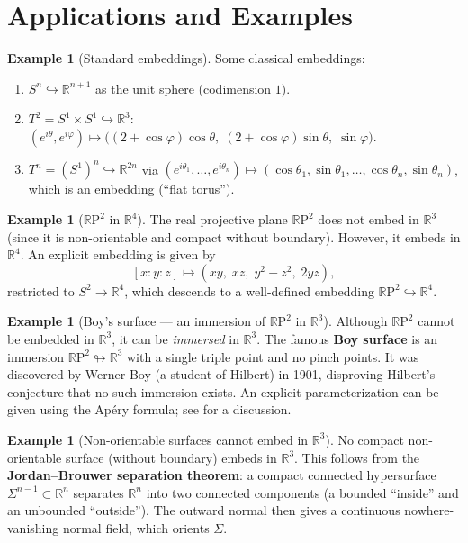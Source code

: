 \documentclass[12pt,a4paper,openany]{book}
\theoremstyle{definition}
\newtheorem{example}[theorem]{Example}
\theoremstyle{remark}
\newcommand{\R}{\mathbb{R}}
\newcommand{\RP}{\mathbb{R}\mathrm{P}}
\begin{document}
\section{Applications and Examples}\label{sec:whitney-applications}

\begin{example}[Standard embeddings]\label{ex:standard-embeddings}
Some classical embeddings:
\begin{enumerate}[label=(\alph*)]
  \item $S^n \hookrightarrow \R^{n+1}$ as the unit sphere (codimension $1$).
  \item $T^2 = S^1 \times S^1 \hookrightarrow \R^3$:
    $(e^{i\theta},e^{i\varphi}) \mapsto
    \bigl((2+\cos\varphi)\cos\theta,\;(2+\cos\varphi)\sin\theta,\;\sin\varphi\bigr)$.
  \item $T^n = (S^1)^n \hookrightarrow \R^{2n}$ via
    $(e^{i\theta_1},\dots,e^{i\theta_n})\mapsto(\cos\theta_1,\sin\theta_1,\dots,\cos\theta_n,\sin\theta_n)$,
    which is an embedding (``flat torus'').
\end{enumerate}
\end{example}

\begin{example}[$\RP^2$ in $\R^4$]\label{ex:rp2-r4}
The real projective plane $\RP^2$ does not embed in $\R^3$
(since it is non-orientable and compact without boundary). However,
it embeds in $\R^4$. An explicit embedding is given by
\[
  [x:y:z] \mapsto (xy,\; xz,\; y^2 - z^2,\; 2yz),
\]
restricted to $S^2 \to \R^4$, which descends to a well-defined
embedding $\RP^2 \hookrightarrow \R^4$.
\end{example}

\begin{example}[Boy's surface --- an immersion of $\RP^2$ in $\R^3$]\label{ex:boy-surface}
Although $\RP^2$ cannot be embedded in $\R^3$, it can be \emph{immersed}
in $\R^3$. The famous \textbf{Boy surface} is an immersion
$\RP^2 \looparrowright \R^3$ with a single triple point and no pinch points.
It was discovered by Werner Boy (a student of Hilbert) in 1901,
disproving Hilbert's conjecture that no such immersion exists.
An explicit parameterization can be given using the Apéry formula;
see \cite{guillemin-pollack} for a discussion.
\end{example}

\begin{example}[Non-orientable surfaces cannot embed in $\R^3$]\label{ex:nonorientable-no-r3}
No compact non-orientable surface (without boundary) embeds in $\R^3$.
This follows from the \textbf{Jordan--Brouwer separation theorem}:
a compact connected hypersurface $\Sigma^{n-1}\subset\R^n$ separates
$\R^n$ into two connected components (a bounded ``inside'' and an
unbounded ``outside''). The outward normal then gives a continuous
nowhere-vanishing normal field, which orients $\Sigma$.
\end{example}
\end{document}
